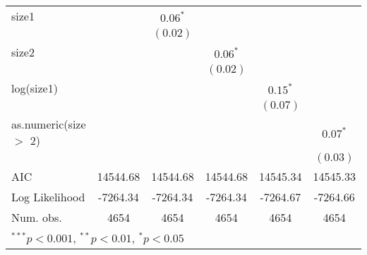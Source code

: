 \begin{table}
\begin{center}
\begin{tabular}{l c c c c c }
size1                  &               & $0.06^{*}$    &               &               &               \\
                       &               & $(0.02)$      &               &               &               \\
size2                  &               &               & $0.06^{*}$    &               &               \\
                       &               &               & $(0.02)$      &               &               \\
log(size1)             &               &               &               & $0.15^{*}$    &               \\
                       &               &               &               & $(0.07)$      &               \\
as.numeric(size $>$ 2) &               &               &               &               & $0.07^{*}$    \\
                       &               &               &               &               & $(0.03)$      \\
\hline
AIC                    & 14544.68      & 14544.68      & 14544.68      & 14545.34      & 14545.33      \\
Log Likelihood         & -7264.34      & -7264.34      & -7264.34      & -7264.67      & -7264.66      \\
Num. obs.              & 4654          & 4654          & 4654          & 4654          & 4654          \\
\hline
\multicolumn{6}{l}{\scriptsize{$^{***}p<0.001$, $^{**}p<0.01$, $^*p<0.05$}}
\end{tabular}
\end{center}
\end{table}
